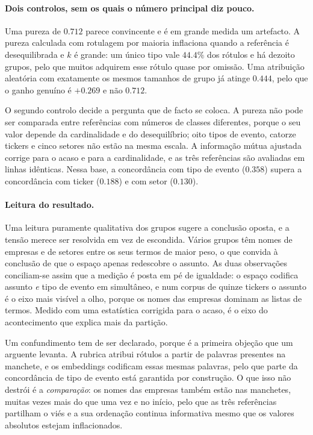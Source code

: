 \paragraph{Dois controlos, sem os quais o número principal diz pouco.} Uma pureza de $0.712$ parece
convincente e é em grande medida um artefacto. A pureza calculada com rotulagem por maioria
inflaciona quando a referência é desequilibrada e $k$ é grande: um único tipo vale $44.4\%$ dos
rótulos e há dezoito grupos, pelo que muitos adquirem esse rótulo quase por omissão. Uma atribuição
aleatória com exatamente os mesmos tamanhos de grupo já atinge $0.444$, pelo que o ganho genuíno é
$+0.269$ e não $0.712$.

O segundo controlo decide a pergunta que de facto se coloca. A pureza não pode ser comparada entre
referências com números de classes diferentes, porque o seu valor depende da cardinalidade e do
desequilíbrio; oito tipos de evento, catorze tickers e cinco setores não estão na mesma escala. A
informação mútua ajustada corrige para o acaso e para a cardinalidade, e as três referências são
avaliadas em linhas idênticas. Nessa base, a concordância com tipo de evento ($0.358$) supera a
concordância com ticker ($0.188$) e com setor ($0.130$).

\paragraph{Leitura do resultado.} Uma leitura puramente qualitativa dos grupos sugere a conclusão
oposta, e a tensão merece ser resolvida em vez de escondida. Vários grupos têm nomes de empresas e de
setores entre os seus termos de maior peso, o que convida à conclusão de que o espaço apenas
redescobre o assunto. As duas observações conciliam-se assim que a medição é posta em pé de
igualdade: o espaço codifica assunto \emph{e} tipo de evento em simultâneo, e num corpus de quinze
tickers o assunto é o eixo mais visível a olho, porque os nomes das empresas dominam as listas de
termos. Medido com uma estatística corrigida para o acaso, é o eixo do acontecimento que explica mais
da partição.

Um confundimento tem de ser declarado, porque é a primeira objeção que um arguente levanta. A rubrica
atribui rótulos a partir de palavras presentes na manchete, e os embeddings codificam essas mesmas
palavras, pelo que parte da concordância de tipo de evento está garantida por construção. O que isso
não destrói é a \emph{comparação}: os nomes das empresas também estão nas manchetes, muitas vezes
mais do que uma vez e no início, pelo que as três referências partilham o viés e a sua ordenação
continua informativa mesmo que os valores absolutos estejam inflacionados.

